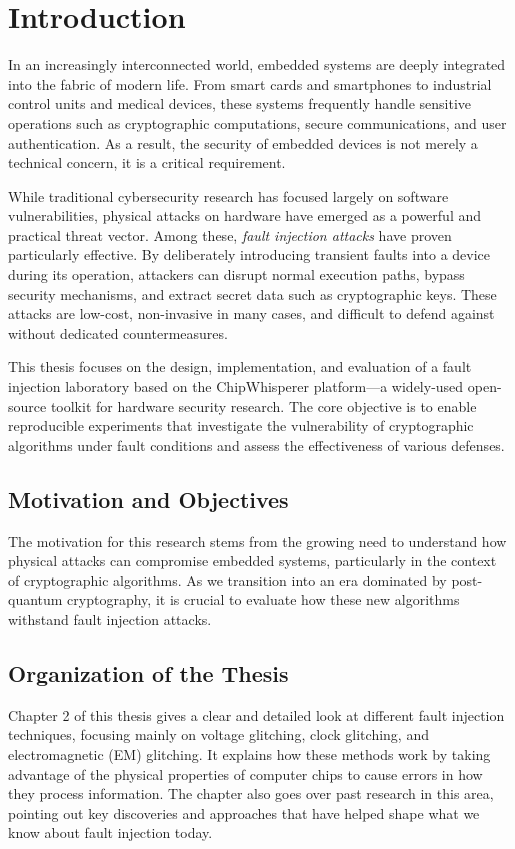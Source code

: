 \chapter{Introduction}


In an increasingly interconnected world, embedded systems are deeply integrated into the fabric of modern life. From smart cards and smartphones to industrial control units and medical devices, these systems frequently handle sensitive operations such as cryptographic computations, secure communications, and user authentication. As a result, the security of embedded devices is not merely a technical concern, it is a critical requirement.

While traditional cybersecurity research has focused largely on software vulnerabilities, physical attacks on hardware have emerged as a powerful and practical threat vector. Among these, \textit{fault injection attacks} have proven particularly effective. By deliberately introducing transient faults into a device during its operation, attackers can disrupt normal execution paths, bypass security mechanisms, and extract secret data such as cryptographic keys. These attacks are low-cost, non-invasive in many cases, and difficult to defend against without dedicated countermeasures.

This thesis focuses on the design, implementation, and evaluation of a fault injection laboratory based on the ChipWhisperer platform—a widely-used open-source toolkit for hardware security research. The core objective is to enable reproducible experiments that investigate the vulnerability of cryptographic algorithms under fault conditions and assess the effectiveness of various defenses.
\section{Motivation and Objectives}
The motivation for this research stems from the growing need to understand how physical attacks can compromise embedded systems, particularly in the context of cryptographic algorithms. As we transition into an era dominated by post-quantum cryptography, it is crucial to evaluate how these new algorithms withstand fault injection attacks. 

\section{Organization of the Thesis}
Chapter 2 of this thesis gives a clear and detailed look at different fault injection techniques, focusing mainly on voltage glitching, clock glitching, and electromagnetic (EM) glitching. It explains how these methods work by taking advantage of the physical properties of computer chips to cause errors in how they process information. The chapter also goes over past research in this area, pointing out key discoveries and approaches that have helped shape what we know about fault injection today.


